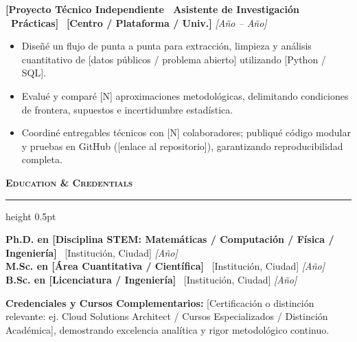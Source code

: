 \documentclass[11pt]{article}
\newcommand{\cvsection}[1]{%
  \vspace{0.35cm}%
  {\bfseries\large\scshape #1}%
  \vspace{0.06cm}%
  {\color{rulecolor}\hrule height 0.5pt}%
  \vspace{0.2cm}%
}
\begin{document}
\medskip

\textbf{[Proyecto Técnico Independiente \textbar \ Asistente de Investigación \textbar \ Prácticas]} \textbar \ \textbf{[Centro / Plataforma / Univ.]} \hfill \textit{[Año -- Año]}
\begin{itemize}[leftmargin=0.4cm, itemsep=2pt, parsep=0pt, topsep=3pt] \small
  \item Diseñé un flujo de punta a punta para extracción, limpieza y análisis cuantitativo de [datos públicos / problema abierto] utilizando [Python / SQL].
  \item Evalué y comparé [N] aproximaciones metodológicas, delimitando condiciones de frontera, supuestos e incertidumbre estadística.
  \item Coordiné entregables técnicos con [N] colaboradores; publiqué código modular y pruebas en GitHub ([enlace al repositorio]), garantizando reproducibilidad completa.
\end{itemize}

\cvsection{Education \& Credentials}
\small
\textbf{Ph.D. en [Disciplina STEM: Matemáticas / Computación / Física / Ingeniería]} \textbar \ [Institución, Ciudad] \hfill \textit{[Año]} \\
\textbf{M.Sc. en [Área Cuantitativa / Científica]} \textbar \ [Institución, Ciudad] \hfill \textit{[Año]} \\
\textbf{B.Sc. en [Licenciatura / Ingeniería]} \textbar \ [Institución, Ciudad] \hfill \textit{[Año]}

\vspace{0.12cm}
\textbf{Credenciales y Cursos Complementarios:} [Certificación o distinción relevante: ej. Cloud Solutions Architect / Cursos Especializados / Distinción Académica], demostrando excelencia analítica y rigor metodológico continuo.
\end{document}
